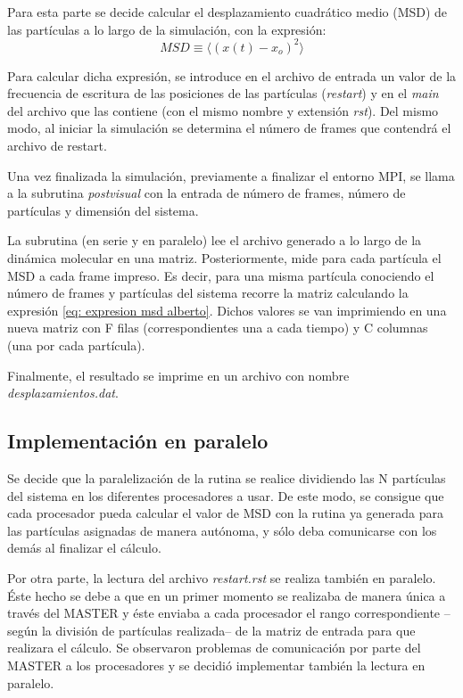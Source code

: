 \documentclass[onecolumn]{article}
\renewcommand{\it}[1]{\textit{#1}}
\begin{document}
Para esta parte se decide calcular el desplazamiento cuadrático medio (MSD) de las partículas a lo largo de la simulación, con la expresión:
\begin{equation}\label{eq: expresion msd alberto}
MSD \equiv \langle\left(x(t)-x_{o}\right)^{2}\rangle
\end{equation}

Para calcular dicha expresión, se introduce en el archivo de entrada un valor de la frecuencia de escritura de las posiciones de las partículas (\it{restart}) y en el  \it{main} del archivo que las contiene (con el mismo nombre y extensión \it{rst}). Del mismo modo, al iniciar la simulación se determina el número de frames que contendrá el archivo de restart.

Una vez finalizada la simulación, previamente a finalizar el entorno MPI, se llama a la subrutina \it{postvisual} con la entrada de número de frames, número de partículas y dimensión del sistema.

La subrutina (en serie y en paralelo) lee el archivo generado a lo largo de la dinámica molecular en una matriz. Posteriormente, mide para cada partícula el MSD a cada frame impreso. Es decir, para una misma partícula conociendo el número de frames y partículas del sistema recorre la matriz calculando la expresión \eqref{eq: expresion msd alberto}. Dichos valores se van imprimiendo en una nueva matriz con F filas (correspondientes una a cada tiempo) y C columnas (una por cada partícula).

Finalmente, el resultado se imprime en un archivo con nombre \it{desplazamientos.dat}.

\subsection{Implementación en paralelo}
Se decide que la paralelización de la rutina se realice dividiendo las N partículas del sistema en los diferentes procesadores a usar. De este modo, se consigue que cada procesador pueda calcular el valor de MSD con la rutina ya generada para las partículas asignadas de manera autónoma, y sólo deba comunicarse con los demás al finalizar el cálculo.

Por otra parte, la lectura del archivo \it{restart.rst} se realiza también en paralelo. Éste hecho se debe a que en un primer momento se realizaba de manera única a través del MASTER y éste enviaba a cada procesador el rango correspondiente --según la división de partículas realizada-- de la matriz de entrada para que realizara el cálculo. Se observaron problemas de comunicación por parte del MASTER a los procesadores y se decidió implementar también la lectura en paralelo.
\end{document}

